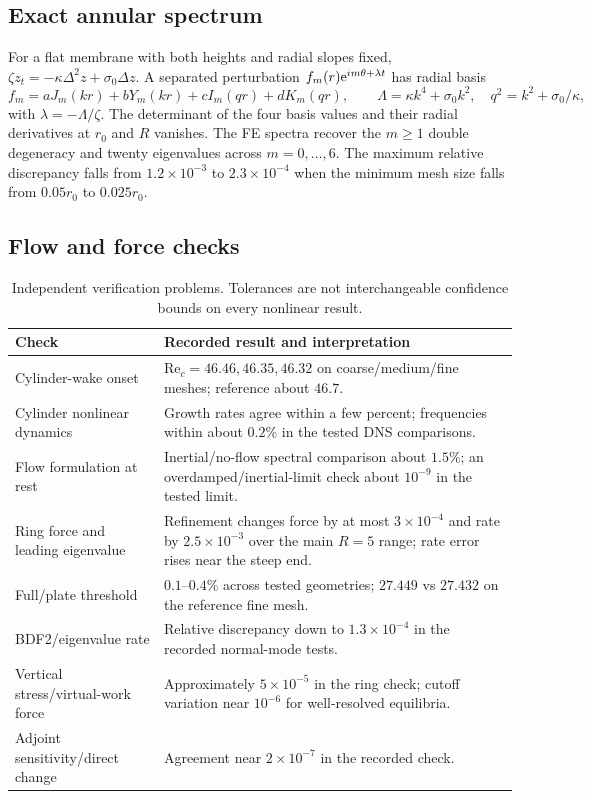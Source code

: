\subsection{Exact annular spectrum}
For a flat membrane with both heights and radial slopes fixed, $\zeta z_t=-\kappa\Delta^2z+\sigma_0\Delta z$. A separated perturbation $f_m(r)\mathrm{e}^{im\theta+\lambda t}$ has radial basis
\begin{equation}
f_m=aJ_m(kr)+bY_m(kr)+cI_m(qr)+dK_m(qr),\qquad
\Lambda=\kappa k^4+\sigma_0k^2,
\quad q^2=k^2+\sigma_0/\kappa,
\end{equation}
with $\lambda=-\Lambda/\zeta$. The determinant of the four basis values and their radial derivatives at $r_0$ and $R$ vanishes. The FE spectra recover the $m\geq1$ double degeneracy and twenty eigenvalues across $m=0,\ldots,6$. The maximum relative discrepancy falls from $1.2\times10^{-3}$ to $2.3\times10^{-4}$ when the minimum mesh size falls from $0.05r_0$ to $0.025r_0$.

\subsection{Flow and force checks}
\begin{table}[h]\centering\small
\begin{tabular}{p{77mm}p{83mm}}
\toprule Check & Recorded result and interpretation\\\midrule
Cylinder-wake onset & $\mathrm{Re}_c=46.46,46.35,46.32$ on coarse/medium/fine meshes; reference about $46.7$.\\
Cylinder nonlinear dynamics & Growth rates agree within a few percent; frequencies within about $0.2\%$ in the tested DNS comparisons.\\
Flow formulation at rest & Inertial/no-flow spectral comparison about $1.5\%$; an overdamped/inertial-limit check about $10^{-9}$ in the tested limit.\\
Ring force and leading eigenvalue & Refinement changes force by at most $3\times10^{-4}$ and rate by $2.5\times10^{-3}$ over the main $R=5$ range; rate error rises near the steep end.\\
Full/plate threshold & $0.1$--$0.4\%$ across tested geometries; $27.449$ vs $27.432$ on the reference fine mesh.\\
BDF2/eigenvalue rate & Relative discrepancy down to $1.3\times10^{-4}$ in the recorded normal-mode tests.\\
Vertical stress/virtual-work force & Approximately $5\times10^{-5}$ in the ring check; cutoff variation near $10^{-6}$ for well-resolved equilibria.\\
Adjoint sensitivity/direct change & Agreement near $2\times10^{-7}$ in the recorded check.\\\bottomrule
\end{tabular}
\caption{Independent verification problems. Tolerances are not interchangeable confidence bounds on every nonlinear result.}
\end{table}

